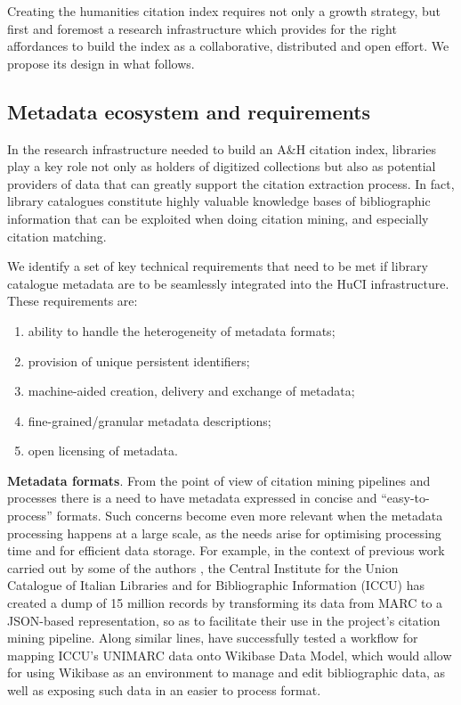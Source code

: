 Creating the humanities citation index requires not only a growth strategy, but first and foremost a research infrastructure which provides for the right affordances to build the index as a collaborative, distributed and open effort. We propose its design in what follows.

\subsection{Metadata ecosystem and requirements}\label{sec:metadata-ecosystem-requirements}

In the research infrastructure needed to build an A\&H citation index, libraries play a key role not only as holders of digitized collections but also as potential providers of data that can greatly support the citation extraction process. In fact, library catalogues constitute highly valuable knowledge bases of bibliographic information that can be exploited when doing citation mining, and especially citation matching. 

We identify a set of key technical requirements that need to be met if library catalogue metadata are to be seamlessly integrated into the HuCI infrastructure. These requirements are:
\begin{enumerate}
    \item ability to handle the heterogeneity of metadata formats;
    \item provision of unique persistent identifiers;
    \item machine-aided creation, delivery and exchange of metadata;
    \item fine-grained/granular metadata descriptions;  
    \item open licensing of metadata.
\end{enumerate}

\textbf{Metadata formats}. From the point of view of citation mining pipelines and processes there is a need to have metadata expressed in concise and ``easy-to-process'' formats. Such concerns become even more relevant when the metadata processing happens at a large scale, as the needs arise for optimising processing time and for efficient data storage. For example, in the context of previous work carried out by some of the authors \cite{colavizza_linked_2018,colavizza_citation_2019}, the Central Institute for the Union Catalogue of Italian Libraries and for Bibliographic Information (ICCU) has created a dump of 15 million records by transforming its data from MARC to a JSON-based representation, so as to facilitate their use in the project’s citation mining pipeline. Along similar lines, \cite{bergamin_new_2018} have successfully tested a workflow for mapping ICCU’s UNIMARC data onto Wikibase Data Model, which would allow for using Wikibase as an environment to manage and edit bibliographic data, as well as exposing such data in an easier to process format.  

